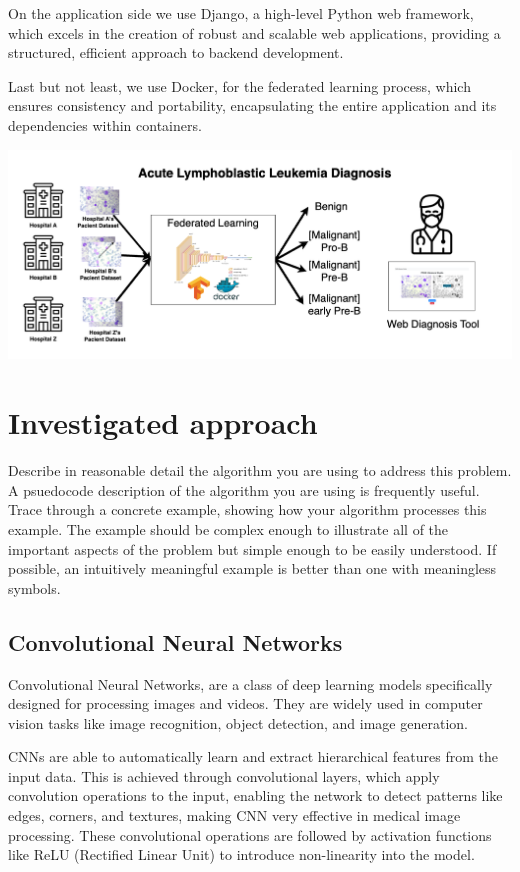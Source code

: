 \documentclass[runningheads,a4paper,11pt]{report}
\begin{document}
On the application side we use Django, a high-level Python web framework, which excels in the creation of robust and scalable web applications, providing a structured, efficient approach to backend development. 

Last but not least, we use Docker, for the federated learning process, which ensures consistency and portability, encapsulating the entire application and its dependencies within containers.

\includegraphics[scale=0.25]{images/diagram.png}


\chapter{Investigated approach}
\label{chapter:proposedApproach}

Describe in reasonable detail the algorithm you are using to address this problem. A psuedocode description of the algorithm you are using is frequently useful. Trace through a concrete example, showing how your algorithm processes this example. The example should be complex enough to illustrate all of the important aspects of the problem but simple enough to be easily understood. If possible, an intuitively meaningful example is better than one with meaningless symbols.

\section{Convolutional Neural Networks}

Convolutional Neural Networks, are a class of deep learning models specifically designed for processing images and videos. They are widely used in computer vision tasks like image recognition, object detection, and image generation. 

CNNs are able to automatically learn and extract hierarchical features from the input data. This is achieved through convolutional layers, which apply convolution operations to the input, enabling the network to detect patterns like edges, corners, and textures, making CNN very effective in medical image processing. These convolutional operations are followed by activation functions like ReLU (Rectified Linear Unit) to introduce non-linearity into the model.
\end{document}
